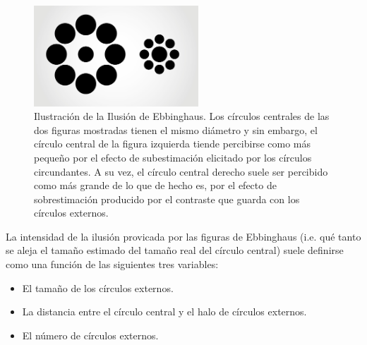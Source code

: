 \begin{figure}[th]
\centering
\includegraphics[width=0.55\textwidth]{Figures/Ebbinghaus} 
\decoRule
\caption[Ilusión de Ebbinghaus: Ejemplos]{Ilustración de la Ilusión de Ebbinghaus. Los círculos centrales de las dos figuras mostradas tienen el mismo diámetro y sin embargo, el círculo central de la figura izquierda tiende percibirse como más pequeño por el efecto de subestimación elicitado por los círculos circundantes. A su vez, el círculo central derecho suele ser percibido como más grande de lo que de hecho es, por el efecto de sobrestimación producido por el contraste que guarda con los círculos externos.}
\label{fig:Ebbinghaus}
\end{figure}

La intensidad de la ilusión provicada por las figuras de Ebbinghaus (i.e. qué tanto se aleja el tamaño estimado del tamaño real del círculo central) suele definirse como una función de las siguientes tres variables: 

\begin{itemize}
\item El tamaño de los círculos externos.
\item La distancia entre el círculo central y el halo de círculos externos.
\item El número de círculos externos.
\end{itemize}

